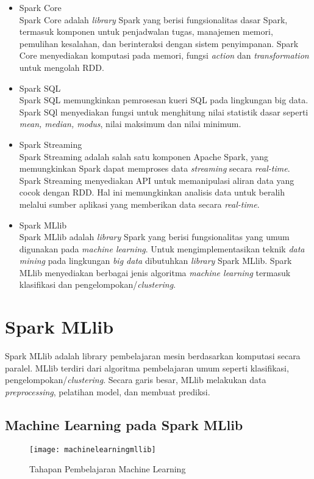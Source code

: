 \begin{itemize}
\item Spark Core \\
Spark Core adalah \textit{library} Spark yang berisi fungsionalitas dasar Spark, termasuk komponen untuk penjadwalan tugas, manajemen memori, pemulihan kesalahan, dan berinteraksi dengan sistem penyimpanan. Spark Core menyediakan komputasi pada memori, fungsi \textit{action} dan \textit{transformation} untuk mengolah RDD.

\item Spark SQL  \\
Spark SQL memungkinkan pemrosesan kueri SQL pada lingkungan big data. Spark SQl menyediakan fungsi untuk menghitung nilai statistik dasar seperti \textit{mean, median, modus}, nilai maksimum dan nilai minimum.

\item Spark Streaming \\
Spark Streaming adalah salah satu komponen Apache Spark, yang memungkinkan Spark dapat memproses data \textit{streaming} secara \textit{real-time}. Spark Streaming menyediakan API untuk memanipulasi aliran data yang cocok dengan RDD. Hal ini memungkinkan analisis data untuk beralih melalui sumber aplikasi yang memberikan data secara \textit{real-time}. 

\item
Spark MLlib \\
Spark MLlib adalah \textit{library} Spark yang berisi fungsionalitas yang umum digunakan pada \textit{machine learning}. Untuk mengimplementasikan teknik \textit{data mining} pada lingkungan \textit{big data} dibutuhkan \textit{library} Spark MLlib. Spark MLlib menyediakan berbagai jenis algoritma \textit{machine learning} termasuk klasifikasi dan pengelompokan/\textit{clustering}.
\end{itemize}

\section{Spark MLlib}
\label{sec:konsep_spark_mllib}
Spark MLlib adalah library pembelajaran mesin berdasarkan komputasi secara paralel. MLlib terdiri dari algoritma pembelajaran umum seperti klasifikasi, pengelompokan/\textit{clustering}. Secara garis besar, MLlib melakukan data \textit{preprocessing}, pelatihan model, dan membuat prediksi.

\subsection{Machine Learning pada Spark MLlib}
\label{sec:ml_sparkmllib}
\begin{figure}[H]
	\centering
	\texttt{[image: machinelearningmllib]}
	\caption{Tahapan Pembelajaran Machine Learning}
	\label{fig:machinelearningmllib}
\end{figure}

